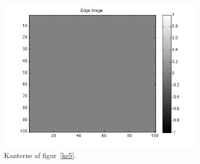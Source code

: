 \documentclass{article}
\begin{document}
	\begin{figure}
		\centering
		\includegraphics[width=4in]{test5_result.jpg}
		\caption{Kanterne af figur~\ref{ke5}.}
		\label{ke5r}
	\end{figure}
\end{document}
